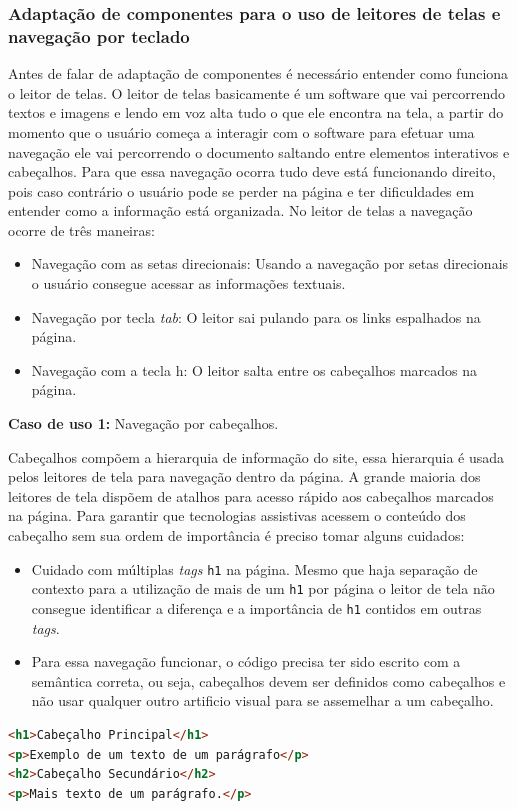 \subsubsection{Adaptação de componentes para o uso de leitores de telas e navegação por teclado}
{Antes de falar de adaptação de componentes é necessário entender como funciona o leitor de telas. O leitor de telas basicamente é um software que vai percorrendo textos e imagens e lendo em voz alta tudo o que ele encontra na tela, a partir do momento que o usuário começa a interagir com o software para efetuar uma navegação ele vai percorrendo o documento saltando entre elementos interativos e cabeçalhos. Para que essa navegação ocorra tudo deve está funcionando direito, pois caso contrário o usuário pode se perder na página e ter dificuldades em entender como a informação está organizada. No leitor de telas a navegação ocorre de três maneiras: 
\begin{itemize}
    \item Navegação com as setas direcionais: Usando a navegação por setas direcionais o usuário consegue acessar as informações textuais.
    \item Navegação por tecla \textit{tab}: O leitor sai pulando para os links espalhados na página.
    \item Navegação com a tecla h: O leitor salta entre os cabeçalhos marcados na página.
\end{itemize}



{\textbf{Caso de uso 1:} Navegação por cabeçalhos.

Cabeçalhos compõem a hierarquia de informação do site, essa hierarquia é usada pelos leitores de tela para navegação dentro da página. A grande maioria dos leitores de tela dispõem de atalhos para acesso rápido aos cabeçalhos marcados na página. Para garantir que tecnologias assistivas acessem o conteúdo dos cabeçalho sem sua ordem de importância é preciso tomar alguns cuidados: 
\begin{itemize}
    \item Cuidado com múltiplas \textit{tags} \lstinline{h1} na página. Mesmo que haja separação de contexto para a utilização de mais de um \lstinline{h1} por página o leitor de tela não consegue identificar a diferença e a importância de \lstinline{h1} contidos em outras \textit{tags}.
    \item Para essa navegação funcionar, o código precisa ter sido escrito com a semântica correta, ou seja, cabeçalhos devem ser definidos como cabeçalhos e não usar qualquer outro artificio visual para se assemelhar a um cabeçalho. 
\end{itemize}
{\begin{lstlisting}[language=html,caption=cabeçalhos com hierarquia]
<h1>Cabeçalho Principal</h1>
<p>Exemplo de um texto de um parágrafo</p>
<h2>Cabeçalho Secundário</h2>
<p>Mais texto de um parágrafo.</p>
\end{lstlisting}}


}}
